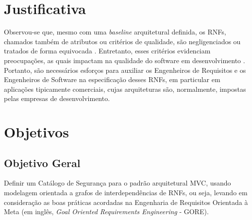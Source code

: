 \section{Justificativa}


Observou-se que, mesmo com uma \textit{baseline}  arquitetural definida, os RNFs, chamados também de atributos ou critérios de qualidade, são negligenciados ou tratados de forma equivocada \cite{eckhardt2016non}. Entretanto, esses critérios evidenciam preocupações, as quais impactam na qualidade do software em desenvolvimento \cite{schneidewind1990standard}.  
Portanto, são necessários esforços para auxiliar os Engenheiros de Requisitos e os Engenheiros de Software na especificação desses RNFs, em particular em aplicações tipicamente comerciais, cujas arquiteturas são, normalmente, impostas pelas empresas de desenvolvimento.


\begin{comment}
	Esse trabalho teve como resultado a especificação de um catálogo centrado no RNF Segurança, no escopo das aplicações web, e no padrão arquitetural MVC aplicado em cenários de desenvolvimento ao qual utilizou-se o \textit{Rails} que trata-se de um \textit{framework} de desenvolvimento web baseado no padrão arquitetural MVC. Para aferir a aderência do catálogo, aplicou-se o mesmo em diferentes cenários de uso, permitindo evoluir o grafo de interdependências em níveis de abstração. Foi possível obter, com essa estratégia, não apenas um catálogo de alto nível de abstração, orientado exclusivamente por critérios de qualidade. Mais precisamente, obteve-se um catálogo até o nível de operacionalizações. Esse nível é mais concreto e possível de ser implementado. Para tanto, foram padronizadas essas operacionalizações com base na tecnologia rails \cite{railscommunity}.
		
\end{comment}


\section{Objetivos}
 
\subsection{Objetivo Geral}

Definir um Catálogo de Segurança para o padrão arquitetural MVC, usando modelagem orientada a grafos de interdependências de RNFs, ou seja, levando em consideração as boas práticas acordadas na Engenharia de Requisitos Orientada à Meta (em inglês, \textit{Goal Oriented Requirements Engineering} - GORE). 

